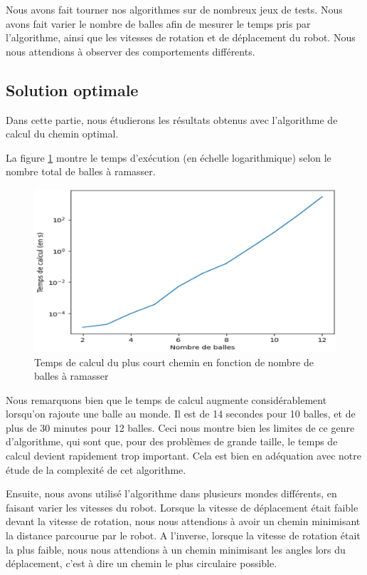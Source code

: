 \documentclass[12pt]{article}
\begin{document}
    Nous avons fait tourner nos algorithmes sur de nombreux jeux de tests. Nous avons fait varier le nombre de balles afin de mesurer le temps pris par l'algorithme, ainsi que les vitesses de rotation et de déplacement du robot. Nous nous attendions à observer des comportements différents.

    \subsection{Solution optimale}
    \label{subsec:result_opt}

    Dans cette partie, nous étudierons les résultats obtenus avec l'algorithme de calcul du chemin optimal.

    La figure \ref{fig:timepathopt} montre le temps d'exécution (en échelle logarithmique) selon le nombre total de balles à ramasser. 

    \begin{figure}[H]
        \centering
        \includegraphics[width=\textwidth]{img/time_path_opt}
        \caption{Temps de calcul du plus court chemin en fonction de nombre de balles à ramasser}
        \label{fig:timepathopt}
    \end{figure}

    Nous remarquons bien que le temps de calcul augmente considérablement lorsqu'on rajoute une balle au monde. Il est de 14 secondes pour 10 balles, et de plus de 30 minutes pour 12 balles. Ceci nous montre bien les limites de ce genre d'algorithme, qui sont que, pour des problèmes de grande taille, le temps de calcul devient rapidement trop important. Cela est bien en adéquation avec notre étude de la complexité de cet algorithme.
    
    \medskip
    
    Ensuite, nous avons utilisé l'algorithme dans plusieurs mondes différents, en faisant varier les vitesses du robot. Lorsque la vitesse de déplacement était faible devant la vitesse de rotation, nous nous attendions à avoir un chemin minimisant la distance parcourue par le robot. A l'inverse, lorsque la vitesse de rotation était la plus faible, nous nous attendions à un chemin minimisant les angles lors du déplacement, c'est à dire un chemin le plus circulaire possible.
\end{document}
